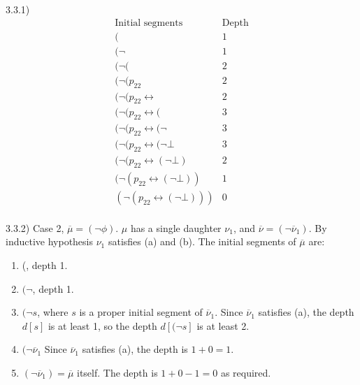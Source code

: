 \documentclass{article}
\theoremstyle{definition}
\newcommand{\lra}{\leftrightarrow}
\begin{document}
3.3.1)
\[
  \begin{array}{lc}
    \text{Initial segments} & \text{Depth} \\
    (                            & 1 \\
    (\neg                        & 1 \\
    (\neg(                       & 2 \\
    (\neg(p_{22}                 & 2 \\
    (\neg(p_{22}\lra             & 2 \\
    (\neg(p_{22}\lra(            & 3 \\
    (\neg(p_{22}\lra(\neg        & 3 \\
    (\neg(p_{22}\lra(\neg\bot    & 3 \\
    (\neg(p_{22}\lra(\neg\bot)   & 2 \\
    (\neg(p_{22}\lra(\neg\bot))  & 1 \\
    (\neg(p_{22}\lra(\neg\bot))) & 0 \\
  \end{array}
\]

3.3.2) Case 2, \(\overline{\mu} = (\neg \phi)\). \(\mu\) has a single daughter \(\nu_1\), and \(\overline{\nu} = (\neg\overline{\nu}_1)\). By inductive hypothesis \(\nu_1\) satisfies (a) and (b). The initial segments of \(\overline{\mu}\) are:
\begin{enumerate}
  \item (, depth 1.
  \item \((\neg\), depth 1.
  \item \((\neg s\), where \(s\) is a proper initial segment of
  \(\overline{\nu}_1\). Since \(\overline{\nu}_1\) satisfies (a), the depth
  \(d[s]\) is at least 1, so the depth \(d[(\neg s]\) is at least 2.
  \item \((\neg\overline{\nu}_1\) Since \(\overline{\nu}_1\) satisfies (a), the depth is \(1+0=1\).
  \item \((\neg\overline{\nu}_1) = \overline{\mu}\) itself. The depth is \(1+0-1=0\) as required.
\end{enumerate}
\end{document}
